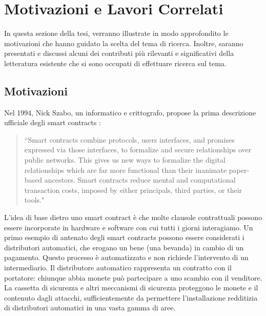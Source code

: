 \documentclass[../../Thesis.tex]{subfiles}
\begin{document}
\chapter{Motivazioni e Lavori Correlati}
In questa sezione della tesi, verranno illustrate in modo approfondito le motivazioni che hanno guidato la scelta del tema di ricerca. Inoltre, saranno presentati e discussi alcuni dei contributi più rilevanti e significativi della letteratura esistente che si sono occupati di effettuare ricerca sul tema.

\section{Motivazioni}
\label{ch:motivations}

Nel 1994, Nick Szabo, un informatico e crittografo, propose la prima descrizione ufficiale degli smart contracts \cite{Szabo_1997}:
 \begin{quotation}
    ``Smart contracts combine protocols, users interfaces, and promises expressed via those interfaces, to formalize and secure relationships over public networks. This gives us new ways to formalize the digital relationships which are far more functional than their inanimate paper-based ancestors. Smart contracts reduce mental and computational transaction costs, imposed by either principals, third parties, or their tools."
 \end{quotation}
L'idea di base dietro uno smart contract è che molte clausole contrattuali possono essere incorporate in hardware e software con cui tutti i giorni interagiamo. Un primo esempio di antenato degli smart contracts possono essere considerati i distributori automatici, che erogano un bene (una bevanda) in cambio di un pagamento. Questo processo è automatizzato e non richiede l'intervento di un intermediario. Il distributore automatico rappresenta un contratto con il portatore: chiunque abbia monete può partecipare a uno scambio con il venditore. La cassetta di sicurezza e altri meccanismi di sicurezza proteggono le monete e il contenuto dagli attacchi, sufficientemente da permettere l'installazione redditizia di distributori automatici in una vasta gamma di aree.
\end{document}
